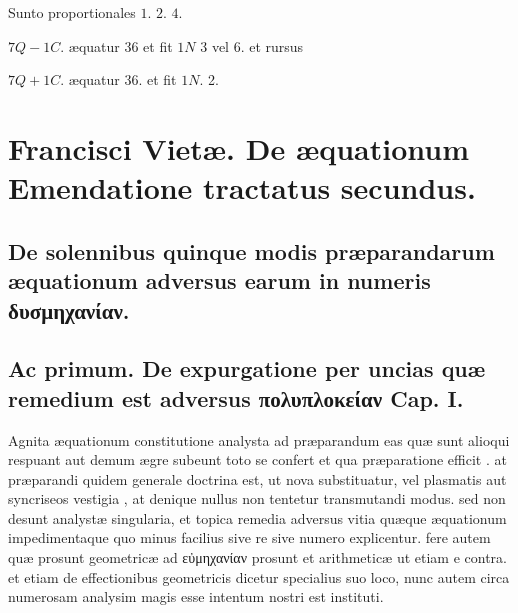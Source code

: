 \documentclass[11pt,a4paper]{article}
\begin{document}
Sunto proportionales $1$. $2$. $4$.

$7Q - 1C$. æquatur 36 et fit $1N$ 3 vel 6. et rursus

$7Q + 1C$. æquatur 36. et fit $1N$. 2.


\section*{Francisci Vietæ. De æquationum Emendatione tractatus secundus.}

\subsection*{De solennibus quinque modis præparandarum æquationum adversus earum in numeris δυσμηχανίαν.}

\subsection*{Ac primum. De expurgatione per uncias quæ remedium est adversus πολυπλοκείαν Cap. I.}


Agnita æquationum constitutione analysta ad præparandum eas quæ sunt alioqui  respuant aut demum ægre subeunt toto se confert et qua præparatione efficit . at præparandi quidem generale doctrina est, ut nova \ill{} substituatur, vel plasmatis aut syncriseos vestigia , at denique nullus non tentetur transmutandi modus. sed non desunt analystæ singularia, et topica remedia adversus vitia quæque æquationum impedimentaque quo minus facilius sive re sive numero explicentur. fere autem quæ prosunt geometricæ ad εὐμηχανίαν prosunt et arithmeticæ ut etiam e contra. et etiam de effectionibus geometricis dicetur specialius suo loco, nunc autem circa numerosam analysim magis esse intentum nostri est instituti.
\end{document}
